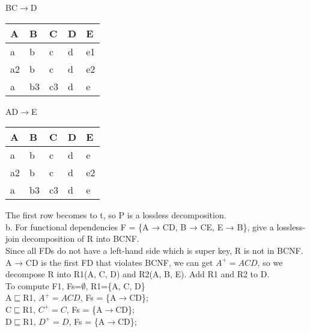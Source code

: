 \documentclass[]{article}
\begin{document}
	BC$\rightarrow$D \\
	
	\begin{table}[H]
		\begin{tabular}{|l|l|l|l|l|}
			\hline
			A & B & C & D  & E  \\ \hline
			a & b & c & d & e1 \\ \hline
			a2 & b & c & d & e2 \\ \hline
			a & b3 & c3 & d & e \\ \hline
		\end{tabular}
	\end{table}

	AD$\rightarrow$E \\
	
	\begin{table}[H]
		\begin{tabular}{|l|l|l|l|l|}
			\hline
			A & B & C & D  & E  \\ \hline
			a & b & c & d & e \\ \hline
			a2 & b & c & d & e2 \\ \hline
			a & b3 & c3 & d & e \\ \hline
		\end{tabular}
	\end{table}
	
	\noindent The first row becomes to t, so P is a lossless decomposition.  \\
	
	\noindent b. For functional dependencies F = \{A → CD, B → CE, E → B\}, give a lossless-join decomposition of R into BCNF.  \\
	
	\noindent Since all FDs do not have a left-hand side which is super key, R is not in BCNF. \\
	
	\noindent A → CD is the first FD that violates BCNF, we can get $A^{+}=ACD$, so we decompose R into R1(A, C, D) and R2(A, B, E). Add R1 and R2 to D.  \\ 
	
	\noindent To compute F1, Fs=$\emptyset$, R1=\{A, C, D\}   \\
	
	A$\sqsubseteq$R1, $A^{+}=ACD$, Fs = \{A$\rightarrow$CD\};   \\
	
	C$\sqsubseteq$R1, $C^{+}=C$, Fs = \{A$\rightarrow$CD\};   \\
	
	D$\sqsubseteq$R1, $D^{+}=D$, Fs = \{A$\rightarrow$CD\};   \\
	
\end{document}
